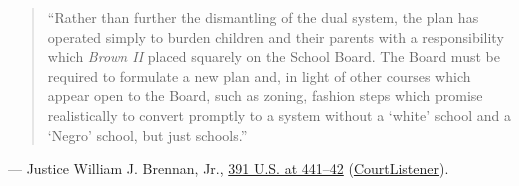 \documentclass[12pt]{article}
\begin{document}
\begin{quote}
``Rather than further the dismantling of the dual system, the plan has operated simply to burden children and their parents with a responsibility which \textit{Brown II} placed squarely on the School Board. The Board must be required to formulate a new plan and, in light of other courses which appear open to the Board, such as zoning, fashion steps which promise realistically to convert promptly to a system without a `white' school and a `Negro' school, but just schools.''
\end{quote}
\noindent --- Justice William J. Brennan, Jr., \href{https://supreme.justia.com/cases/federal/us/391/430/}{391 U.S. at 441--42} (\href{https://www.courtlistener.com/opinion/107705/green-v-county-school-board-of-new-kent-county/}{CourtListener}).
\end{document}
